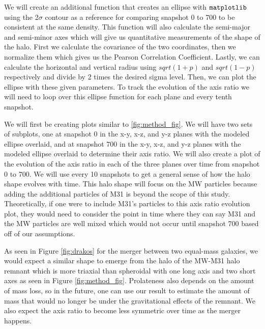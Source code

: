 \documentclass[linenumbers, twocolumn]{aastex631}
\begin{document}
We will create an additional function that creates an ellipse with $\tt{matplotlib}$ using the 2$\sigma$ contour as a reference for comparing snapshot 0 to 700 to be consistent at the same density. This function will also calculate the semi-major and semi-minor axes which will give us quantitative measurements of the shape of the halo. First we calculate the covariance of the two coordinates, then we normalize them which gives us the Pearson Correlation Coefficient. Lastly, we can calculate the horizontal and vertical radius using $sqrt(1+p)$ and $sqrt(1-p)$ respectively and divide by 2 times the desired sigma level. Then, we can plot the ellipse with these given parameters.
To track the evolution of the axis ratio we will need to loop over this ellipse function for each plane and every tenth snapshot.



We will first be creating plots similar to \ref{fig:method_fig}. We will have two sets of subplots, one at snapshot 0 in the x-y, x-z, and y-z planes with the modeled ellipse overlaid, and at snapshot 700 in the x-y, x-z, and y-z planes with the modeled ellipse overlaid to determine their axis ratio. We will also create a plot of the evolution of the axis ratio in each of the three planes over time from snapshot 0 to 700. We will use every 10 snapshots to get a general sense of how the halo shape evolves with time. This halo shape will focus on the MW particles because adding the additional particles of M31 is beyond the scope of this study. Theoretically, if one were to include M31's particles to this axis ratio evolution plot, they would need to consider the point in time where they can say M31 and the MW particles are well mixed which would not occur until snapshot 700 based off of our assumptions.


As seen in Figure \ref{fig:drakos} for the merger between two equal-mass galaxies, we would expect a similar shape to emerge from the halo of the MW-M31 halo remnant which is more triaxial than spheroidal with one long axis and two short axes as seen in Figure \ref{fig:method_fig}. 
Prolateness also depends on the amount of mass loss, so in the future, one can use our result to estimate the amount of mass that would no longer be under the gravitational effects of the remnant.
We also expect the axis ratio to become less symmetric over time as the merger happens.
\end{document}
